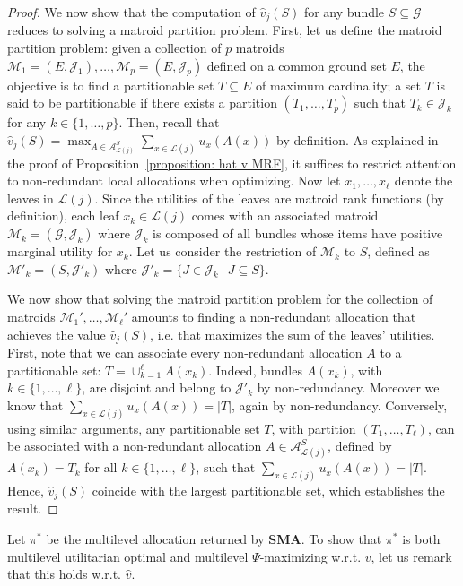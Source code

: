 \documentclass[]{article}
\newcommand{\items}{\mathcal{G}}
\newcommand{\leaves}{\mathcal{L}}
\newcommand{\allocations}{\mathcal{A}}
\begin{document}
\begin{proof}
We now show that the computation of $\hat{v}_j(S)$ for any bundle $S \subseteq \items$ reduces to solving a matroid partition problem. First, let us define the matroid partition problem: given a collection of $p$ matroids $\mathcal{M}_1 = (E, \mathcal{J}_1), \ldots, \mathcal{M}_p = (E, \mathcal{J}_p)$ defined on a common ground set $E$, the objective is to find a partitionable set $T \subseteq E$ of maximum cardinality; a set $T$ is said to be partitionable if there exists a partition $(T_1, \ldots, T_p)$ such that $T_k \in \mathcal{J}_k$ for any $k \in \{1, \ldots, p\}$. Then, recall that $\hat{v}_j(S) = \max_{A \in \allocations^S_{\leaves(j)}} \sum_{x \in \leaves(j)} u_x(A(x))$ by definition. As  explained in the proof of Proposition~\ref{proposition: hat v MRF}, it suffices to restrict attention to non-redundant local allocations when optimizing. Now let $x_1, \ldots, x_\ell$ denote the leaves in $\leaves(j)$. Since the utilities of the leaves are matroid rank functions (by definition), each leaf $x_k \in \leaves(j)$ comes with an associated matroid $\mathcal{M}_k = (\items, \mathcal{J}_k)$ where $\mathcal{J}_k$ is composed of all bundles whose items have positive marginal utility for $x_k$. Let us consider the restriction of $\mathcal{M}_k$ to $S$, defined as $\mathcal{M}'_k = (S,\mathcal{J}'_k)$ where $\mathcal{J}'_k = \{J \in \mathcal{J}_k \ | \ J \subseteq S\}$. 

We now show that solving the matroid partition problem for the collection of matroids $\mathcal{M}_1', \ldots, \mathcal{M}_\ell'$ amounts to finding a non-redundant allocation that achieves the value $\hat{v}_j(S)$, i.e. that maximizes the sum of the leaves' utilities. First, note that we can associate every non-redundant allocation $A$ to a partitionable set: $T=\cup_{k=1}^\ell A(x_k)$. Indeed, bundles $A(x_k)$, with $k \in \{1, \ldots, \ell\}$, are disjoint and belong to $\mathcal{J}'_k$ by non-redundancy. Moreover we know that $\sum_{x \in \leaves(j)} u_x(A(x)) = |T|$, again by non-redundancy. Conversely, using similar arguments, any partitionable set $T$, with partition $(T_1,\ldots, T_\ell)$, can be associated with a non-redundant allocation $A\in \allocations^S_{\leaves(j)}$, defined by $A(x_k) = T_k$ for all $k \in \{1, \ldots, \ell\}$, such that $\sum_{x \in \leaves(j)} u_x(A(x)) = |T|$. Hence, $\hat{v}_j(S)$ coincide with the largest partitionable set, which establishes the result. 
\end{proof}

Let $\pi^*$ be the multilevel allocation returned by {\bf SMA}. To show that $\pi^*$ is both multilevel utilitarian optimal and multilevel $\Psi$-maximizing w.r.t. $v$, let us remark that this holds w.r.t. $\hat{v}$. 
\end{document}
